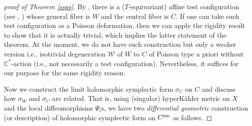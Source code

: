 \documentclass[12pt,a4paper]{amsart}
\theoremstyle{remark}
\theoremstyle{definition}
\def\C{\mathbb{C}}
\begin{document}
\begin{proof}[proof of Theorem \ref{ssps}]
     By \cite{DSII, LWX}, there is a ($T$-equivariant)  affine test configuration 
     (see \cite[Definition 5.1]{CS}, \cite[\S 2, Definition 2.15 (i)]{Od24a}) whose general fiber is $W$ and the central fiber is $C$. 
If one can take such test configuration 
as a Poisson deformation, then 
we can apply the rigidity result \cite[\S 3]{Namf} to show 
that it is actually trivial, which implies the 
latter statement of the theorem. 
At the moment, we do not have such construction but only a 
weaker version i.e., isotrivial degeneration 
$\mathcal{W}$ 
of $W$ to $C$ 
of Poisson type a priori without $\C^*$-action (i.e., 
not necessarily a test configuration). Nevertheless, it suffices for our purpose for the same rigidity reason. 

\vspace{2mm}
 
Now we construct the limit holomorphic symplectic form 
$\sigma_C$ on $C$ and 
discuss 
how $\sigma_W$ and $\sigma_C$ are related. 
That is, using (singular) hyperK\"ahler metric on $X$ and the local diffeomorphisms $\Psi_i$s, 
we have two 
{\it differential geometric} 
construction (or description) of holomorphic 
symplectic form on $C^{\rm sm}$ as follows. 


\end{proof}
\end{document}
